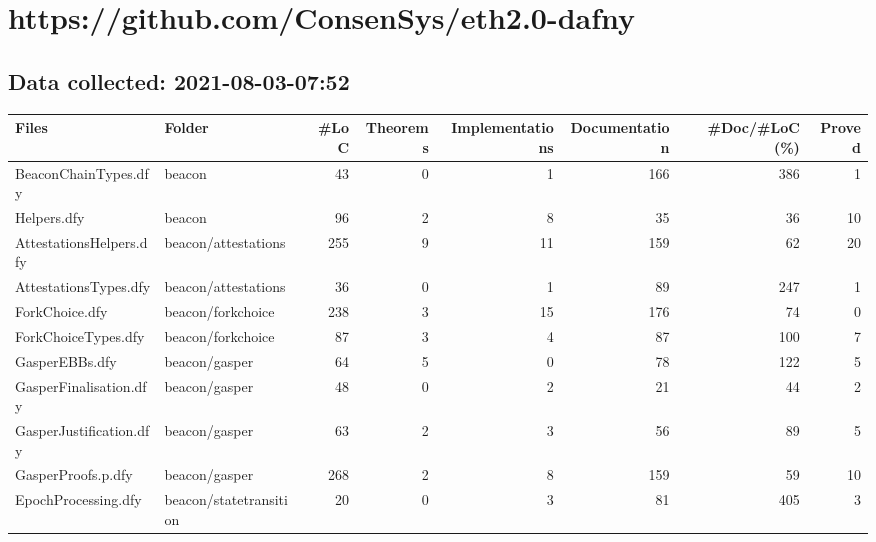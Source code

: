 \documentclass[a4paper, 12pt]{article}
\begin{document}
\section*{https://github.com/ConsenSys/eth2.0-dafny}
\subsection*{Data collected: 2021-08-03-07:52}
\scriptsize
\begin{tabular}{llrrrrrr}
\toprule
                   Files &                  Folder &  \#LoC &  Theorems &  Implementations &  Documentation &  \#Doc/\#LoC (\%) &  Proved \\
\midrule
    BeaconChainTypes.dfy &                  beacon &    43 &         0 &                1 &            166 &            386 &       1 \\
             Helpers.dfy &                  beacon &    96 &         2 &                8 &             35 &             36 &      10 \\
 AttestationsHelpers.dfy &     beacon/attestations &   255 &         9 &               11 &            159 &             62 &      20 \\
   AttestationsTypes.dfy &     beacon/attestations &    36 &         0 &                1 &             89 &            247 &       1 \\
          ForkChoice.dfy &       beacon/forkchoice &   238 &         3 &               15 &            176 &             74 &       0 \\
     ForkChoiceTypes.dfy &       beacon/forkchoice &    87 &         3 &                4 &             87 &            100 &       7 \\
          GasperEBBs.dfy &           beacon/gasper &    64 &         5 &                0 &             78 &            122 &       5 \\
  GasperFinalisation.dfy &           beacon/gasper &    48 &         0 &                2 &             21 &             44 &       2 \\
 GasperJustification.dfy &           beacon/gasper &    63 &         2 &                3 &             56 &             89 &       5 \\
      GasperProofs.p.dfy &           beacon/gasper &   268 &         2 &                8 &            159 &             59 &      10 \\
     EpochProcessing.dfy &  beacon/statetransition &    20 &         0 &                3 &             81 &            405 &       3 \\

\end{tabular}
\end{document}
